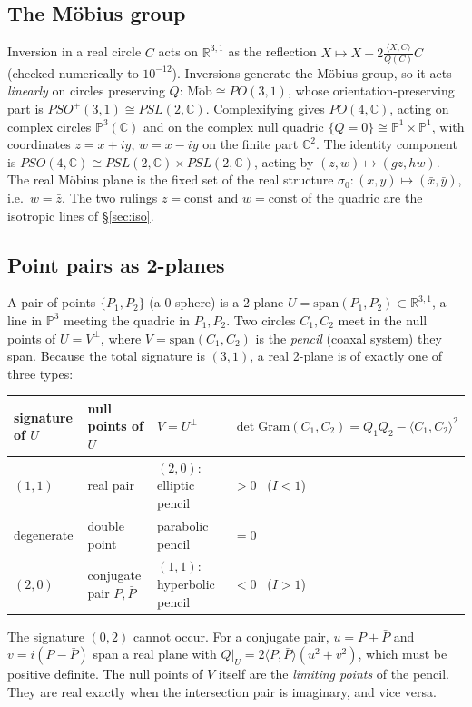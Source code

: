 \documentclass[11pt]{article}
\theoremstyle{definition}\newtheorem{definition}[theorem]{Definition}\newtheorem{remark}[theorem]{Remark}
\newcommand{\C}{\mathbb{C}}\newcommand{\Z}{\mathbb{Z}}\newcommand{\R}{\mathbb{R}}\renewcommand{\Re}{\operatorname{Re}}\renewcommand{\Im}{\operatorname{Im}}
\begin{document}
\subsection{The Möbius group}
Inversion in a real circle $C$ acts on $\R^{3,1}$ as the reflection $X\mapsto X-2\frac{\langle X,C\rangle}{Q(C)}C$ (checked numerically to $10^{-12}$). Inversions generate the Möbius group, so it acts \emph{linearly} on circles preserving $Q$: $\mathrm{M\ddot ob}\cong PO(3,1)$, whose orientation-preserving part is $PSO^+(3,1)\cong PSL(2,\C)$. Complexifying gives $PO(4,\C)$, acting on complex circles $\mathbb{P}^3(\C)$ and on the complex null quadric $\{Q=0\}\cong\mathbb{P}^1\times\mathbb{P}^1$, with coordinates $z=x+iy$, $w=x-iy$ on the finite part $\C^2$. The identity component is $PSO(4,\C)\cong PSL(2,\C)\times PSL(2,\C)$, acting by $(z,w)\mapsto(g z,h w)$. The real Möbius plane is the fixed set of the real structure $\sigma_0:(x,y)\mapsto(\bar x,\bar y)$, i.e.\ $w=\bar z$. The two rulings $z=\mathrm{const}$ and $w=\mathrm{const}$ of the quadric are the isotropic lines of \S\ref{sec:iso}.

\subsection{Point pairs as 2-planes}
A pair of points $\{P_1,P_2\}$ (a $0$-sphere) is a 2-plane $U=\mathrm{span}(P_1,P_2)\subset\R^{3,1}$, a line in $\mathbb{P}^3$ meeting the quadric in $P_1,P_2$. Two circles $C_1,C_2$ meet in the null points of $U=V^\perp$, where $V=\mathrm{span}(C_1,C_2)$ is the \emph{pencil} (coaxal system) they span. Because the total signature is $(3,1)$, a real 2-plane is of exactly one of three types:
\begin{center}\begin{tabular}{llll}
signature of $U$ & null points of $U$ & $V=U^\perp$ & $\det\mathrm{Gram}(C_1,C_2)=Q_1Q_2-\langle C_1,C_2\rangle^2$\\\hline
$(1,1)$ & real pair & $(2,0)$: elliptic pencil & $>0$ \ ($I<1$)\\
degenerate & double point & parabolic pencil & $=0$\\
$(2,0)$ & conjugate pair $P,\bar P$ & $(1,1)$: hyperbolic pencil & $<0$ \ ($I>1$)
\end{tabular}\end{center}
The signature $(0,2)$ cannot occur. For a conjugate pair, $u=P+\bar P$ and $v=i(P-\bar P)$ span a real plane with $Q|_U=2\langle P,\bar P\rangle(u^2+v^2)$, which must be positive definite. The null points of $V$ itself are the \emph{limiting points} of the pencil. They are real exactly when the intersection pair is imaginary, and vice versa.
\end{document}
